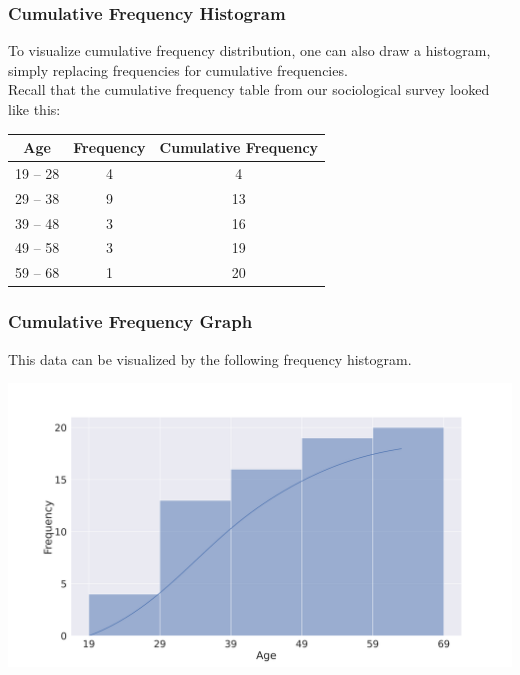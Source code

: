 \documentclass[aspectratio=169,11pt,svgnames]{beamer}
\begin{document}
\begin{frame}
 \frametitle{Cumulative Frequency Histogram}
 To visualize \alert{cumulative frequency distribution}, one can also draw a
 histogram, simply replacing frequencies for cumulative frequencies.\\
 \pause
 Recall that the cumulative frequency table from our sociological survey looked
 like this:
 \begin{center}
  \begin{tabular}{c|c|c}
   \textbf{Age} & \textbf{Frequency} & \textbf{Cumulative Frequency}\\
   \toprule
   19 -- 28 & 4 & 4 \\
   29 -- 38 & 9 & 13 \\
   39 -- 48 & 3 & 16 \\
   49 -- 58 & 3 & 19 \\
   59 -- 68 & 1 & 20
  \end{tabular}
 \end{center}
\end{frame}

\begin{frame}
 \frametitle{Cumulative Frequency Graph}
 This data can be visualized by the following frequency histogram.
 \begin{center}
  \includegraphics[width=.7\textwidth]{survey_cumulative.png}
 \end{center}
\end{frame}
\end{document}
